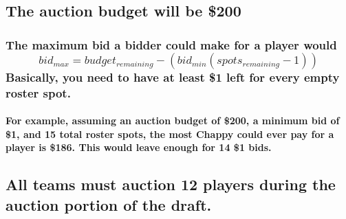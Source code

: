\documentclass[
]{book}
\begin{document}
\hypertarget{the-auction-budget-will-be-200}{%
\subsection{The auction budget will be \$200}\label{the-auction-budget-will-be-200}}

\hypertarget{the-maximum-bid-a-bidder-could-make-for-a-player-would-bid_max-budget_remaining---bid_minspots_remaining---1basically-you-need-to-have-at-least-1-left-for-every-empty-roster-spot.}{%
\subsubsection{\texorpdfstring{The maximum bid a bidder could make for a player would \[bid_{max} = budget_{remaining} - (bid_{min}(spots_{remaining} - 1))\]Basically, you need to have at least \$1 left for every empty roster spot.}{The maximum bid a bidder could make for a player would bid\_\{max\} = budget\_\{remaining\} - (bid\_\{min\}(spots\_\{remaining\} - 1))Basically, you need to have at least \$1 left for every empty roster spot.}}\label{the-maximum-bid-a-bidder-could-make-for-a-player-would-bid_max-budget_remaining---bid_minspots_remaining---1basically-you-need-to-have-at-least-1-left-for-every-empty-roster-spot.}}

\hypertarget{for-example-assuming-an-auction-budget-of-200-a-minimum-bid-of-1-and-15-total-roster-spots-the-most-chappy-could-ever-pay-for-a-player-is-186.-this-would-leave-enough-for-14-1-bids.}{%
\paragraph{For example, assuming an auction budget of \$200, a minimum bid of \$1, and 15 total roster spots, the most Chappy could ever pay for a player is \$186. This would leave enough for 14 \$1 bids.}\label{for-example-assuming-an-auction-budget-of-200-a-minimum-bid-of-1-and-15-total-roster-spots-the-most-chappy-could-ever-pay-for-a-player-is-186.-this-would-leave-enough-for-14-1-bids.}}

\hypertarget{all-teams-must-auction-12-players-during-the-auction-portion-of-the-draft.}{%
\subsection{All teams must auction 12 players during the auction portion of the draft.}\label{all-teams-must-auction-12-players-during-the-auction-portion-of-the-draft.}}
\end{document}
